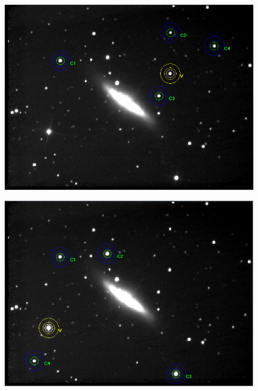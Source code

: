 \documentclass[12pt]{article}
\begin{document}
\begin{figure}[H]
\centering
\begin{multicols}{2}
\begin{minipage}[H]{0.5\textwidth}
\includegraphics[scale=0.43]{Images/AsImages/SI/Sr1-Aperture.PNG} \\ 
\end{minipage}
\begin{minipage}[H]{0.5\textwidth}
\includegraphics[scale=0.43]{Images/AsImages/SI/Sr3-Aperture.PNG}
\end{minipage}
\begin{minipage}[H]{0.5\textwidth}

\end{minipage}
\end{multicols}
\end{figure}
\end{document}
